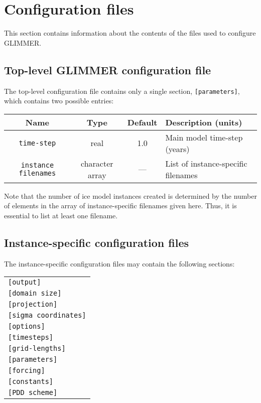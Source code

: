 \section{Configuration files}
%
This section contains information about the contents of the files
used to configure GLIMMER.
%
\subsection{Top-level GLIMMER configuration file}
%
The top-level configuration file contains only a single section,
\texttt{[parameters]}, which contains two possible entries:
\begin{center}
\begin{tabular}{|c|c|c|l|}
\hline
Name & Type & Default & Description (units) \\
\hline
\hline
\texttt{time-step} & real & 1.0 & Main model time-step (years) \\
\hline
\texttt{instance filenames} & character array & --- & List of
instance-specific filenames \\
\hline
\end{tabular}
\end{center}
%
Note that the number of ice model instances created is determined by the
number of elements in the array of instance-specific filenames given
here. Thus, it is essential to list at least one filename.
%
\subsection{Instance-specific configuration files}
%
The instance-specific configuration files may contain the following sections:
\begin{center}
\begin{tabular}{l}
\texttt{[output]} \\
\texttt{[domain size]} \\
\texttt{[projection]} \\
\texttt{[sigma coordinates]} \\
\texttt{[options]} \\
\texttt{[timesteps]} \\
\texttt{[grid-lengths]} \\
\texttt{[parameters]} \\
\texttt{[forcing]} \\
\texttt{[constants]} \\
\texttt{[PDD scheme]} \\
\end{tabular}
\end{center}
%
